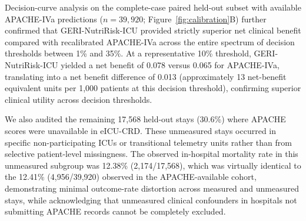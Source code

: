 \documentclass[utf8]{FrontiersinVancouver}
\newcommand{\re}[1]{#1}
\begin{document}
\re{Decision-curve analysis on the complete-case paired held-out subset with available APACHE-IVa predictions ($n=39,920$; Figure~\ref{fig:calibration}B) further confirmed that GERI-NutriRisk-ICU provided strictly superior net clinical benefit compared with recalibrated APACHE-IVa across the entire spectrum of decision thresholds between 1\% and 35\%. At a representative 10\% threshold, GERI-NutriRisk-ICU yielded a net benefit of 0.078 versus 0.065 for APACHE-IVa, translating into a net benefit difference of 0.013 (approximately 13 net-benefit equivalent units per 1,000 patients at this decision threshold), confirming superior clinical utility across decision thresholds.}

\re{We also audited the remaining 17,568 held-out stays (30.6\%) where APACHE scores were unavailable in eICU-CRD. These unmeasured stays occurred in specific non-participating ICUs or transitional telemetry units rather than from selective patient-level missingness. The observed in-hospital mortality rate in this unmeasured subgroup was 12.38\% (2,174/17,568), which was virtually identical to the 12.41\% (4,956/39,920) observed in the APACHE-available cohort, demonstrating minimal outcome-rate distortion across measured and unmeasured stays, while acknowledging that unmeasured clinical confounders in hospitals not submitting APACHE records cannot be completely excluded.}

\begin{table}[htbp]
\centering
\caption{Same-subset comparison of APACHE-IV/IVa with GERI-NutriRisk-ICU in held-out eICU-CRD. Bold values indicate the better model value or the positive paired difference; lower Brier score is better.}
\label{tab:apache}
\end{table}
\end{document}
